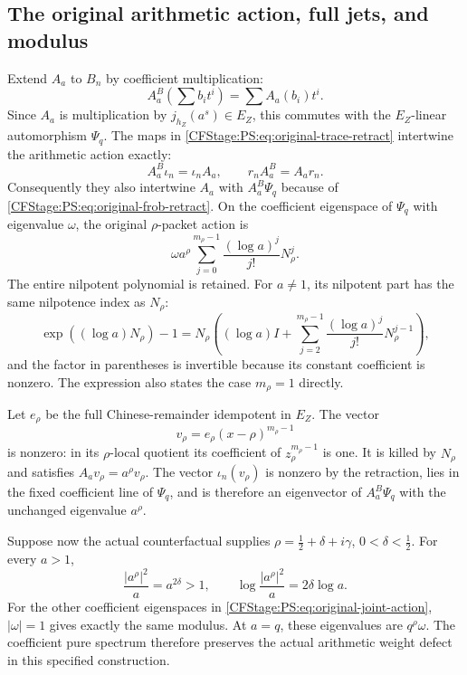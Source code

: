 \subsection{The original arithmetic action, full jets, and modulus}

Extend $A_a$ to $B_n$ by coefficient multiplication:
\[
 A_a^{B}\left(\sum b_it^i\right)=\sum A_a(b_i)t^i.
\]
Since $A_a$ is multiplication by $j_{h_Z}(a^s)\in E_Z$,
this commutes with the $E_Z$-linear automorphism $\Psi_q$.
The maps in \eqref{CFStage:PS:eq:original-trace-retract} intertwine the
arithmetic action exactly:
\[
 A_a^B\iota_n=\iota_n A_a,\qquad
 r_n A_a^B=A_a r_n.
\]
Consequently they also intertwine $A_a$ with
$A_a^B\Psi_q$ because of \eqref{CFStage:PS:eq:original-frob-retract}.
On the coefficient eigenspace of $\Psi_q$ with eigenvalue
$\omega$, the original $\rho$-packet action is
\begin{equation}
 \omega a^\rho
 \sum_{j=0}^{m_\rho-1}\frac{(\log a)^j}{j!}N_\rho^j.
 \label{CFStage:PS:eq:original-joint-action}
\end{equation}
The entire nilpotent polynomial is retained. For $a\ne1$, its
nilpotent part has the same nilpotence index as $N_\rho$:
\[
 \exp((\log a)N_\rho)-1
 =N_\rho\left((\log a)I+
 \sum_{j=2}^{m_\rho-1}\frac{(\log a)^j}{j!}N_\rho^{j-1}\right),
\]
and the factor in parentheses is invertible because its constant
coefficient is nonzero. The expression also states the case
$m_\rho=1$ directly.

Let $e_\rho$ be the full Chinese-remainder idempotent in $E_Z$.
The vector
\[
 v_\rho=e_\rho(x-\rho)^{m_\rho-1}
\]
is nonzero: in its $\rho$-local quotient its coefficient of
$z_\rho^{m_\rho-1}$ is one. It is killed by $N_\rho$ and satisfies
$A_av_\rho=a^\rho v_\rho$. The vector $\iota_n(v_\rho)$ is
nonzero by the retraction, lies in the fixed coefficient line of
$\Psi_q$, and is therefore an eigenvector of $A_a^B\Psi_q$ with
the unchanged eigenvalue $a^\rho$.

Suppose now the actual counterfactual supplies
$\rho=\tfrac12+\delta+i\gamma$, $0<\delta<\tfrac12$.
For every $a>1$,
\begin{equation}
 \frac{|a^\rho|^2}{a}=a^{2\delta}>1,
 \qquad
 \log\frac{|a^\rho|^2}{a}=2\delta\log a.
 \label{CFStage:PS:eq:original-surviving-defect}
\end{equation}
For the other coefficient eigenspaces in
\eqref{CFStage:PS:eq:original-joint-action}, $|\omega|=1$ gives exactly the
same modulus. At $a=q$, these eigenvalues are $q^\rho\omega$.
The coefficient pure spectrum therefore preserves the actual
arithmetic weight defect in this specified construction.

